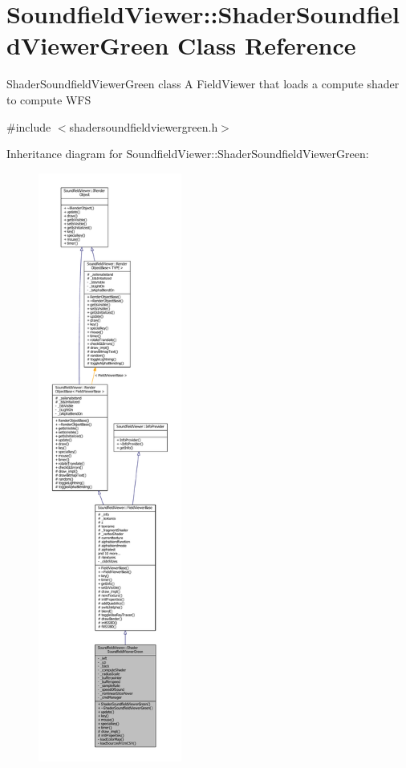 \section{Soundfield\-Viewer\-:\-:Shader\-Soundfield\-Viewer\-Green Class Reference}
\label{classSoundfieldViewer_1_1ShaderSoundfieldViewerGreen}


Shader\-Soundfield\-Viewer\-Green class A Field\-Viewer that loads a compute shader to compute W\-F\-S  




{\ttfamily \#include $<$shadersoundfieldviewergreen.\-h$>$}



Inheritance diagram for Soundfield\-Viewer\-:\-:Shader\-Soundfield\-Viewer\-Green\-:\nopagebreak
\begin{figure}[H]
\begin{center}
\leavevmode
\includegraphics[height=550pt]{d3/d12/classSoundfieldViewer_1_1ShaderSoundfieldViewerGreen__inherit__graph}
\end{center}
\end{figure}


